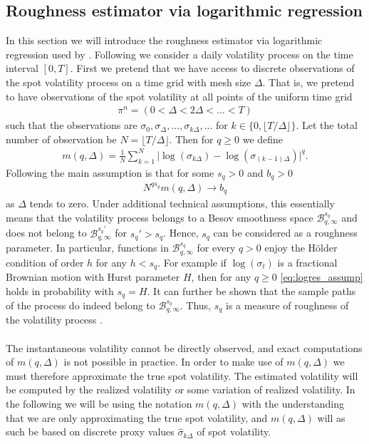 \documentclass{article}
\begin{document}
\subsection{Roughness estimator via logarithmic regression} 
In this section we will introduce the roughness estimator via logarithmic regression used by \cite{gatheral}. Following \cite{gatheral} we consider a daily volatility process on the time interval $[0,T]$. First we pretend that we have access to discrete observations of the spot volatility process on a time grid with mesh size $\Delta$. That is, we pretend to have observations of the spot volatility at all points of the uniform time grid
\begin{align*}
\pi^n = \left( 0 < \Delta< 2\Delta <...< T\right)
\end{align*}
such that the observations are $\sigma_0, \sigma_\Delta, ..., \sigma_{k\Delta},...$ for $k \in \{0, \lfloor T / \Delta \rfloor\}$. Let the total number of observation be $N=\lfloor T / \Delta \rfloor$. Then for $q\geq 0$ we define
\begin{align*}
m(q,\Delta) = \frac{1}{N} \sum_{k=1}^N \lvert \log(\sigma_{k\Delta})-\log(\sigma_{(k-1)\Delta})\rvert^q.
\end{align*}
Following \cite{gatheral} the main assumption is that for some $s_q>0$ and $b_q>0$
\begin{align}
N^{qs_q}m(q,\Delta)\to b_q \label{eq:logres_assump}
\end{align}
as $\Delta$ tends to zero. Under additional technical assumptions, this essentially means that the volatility process belongs to a Besov smoothness space $\mathcal{B}^{s_q}_{q,\infty}$ and does not belong to $\mathcal{B}^{s_q'}_{q,\infty}$ for $s_q'>s_q$. Hence, $s_q$ can be considered as a roughness parameter. In particular, functions in $\mathcal{B}^{s_q}_{q,\infty}$ for every $q>0$ enjoy the Hölder condition of order $h$ for any $h<s_q$. For example if $\log(\sigma_t)$ is a fractional Brownian motion with Hurst parameter $H$, then for any $q\geq 0$ \eqref{eq:logres_assump} holds in probability with $s_q=H$. It can further be shown that the sample paths of the process do indeed belong to $\mathcal{B}^{s_q}_{q,\infty}$. Thus, $s_q$ is a measure of roughness of the volatility process \cite{gatheral}.\\\\
The instantaneous volatility cannot be directly observed, and exact computations of $m(q,\Delta)$ is not possible in practice.  In order to make use of $m(q,\Delta)$ we must therefore approximate the true spot volatility. The estimated volatility will be computed by the realized volatility or some variation of realized volatility. In the following we will be using the notation $m(q, \Delta)$ with the understanding that we are only approximating the true spot volatility, and $m(q, \Delta)$ will as such be based on discrete proxy values $\hat{\sigma}_{k\Delta}$ of spot volatility.\\
\end{document}
